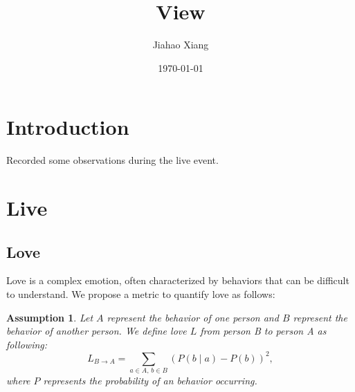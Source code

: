 \documentclass{article}
\title{View}
\author{Jiahao Xiang}
\date{\today}
\newtheorem{assumption}{Assumption}
\begin{document}
\maketitle

\section{Introduction}
Recorded some observations during the live event.

\section{Live}
\subsection{Love}
Love is a complex emotion, often characterized by behaviors that can be difficult to understand. We propose a metric to quantify love as follows:

\begin{assumption}
    Let $A$ represent the behavior of one person and $B$ represent the behavior of another person. We define love $L$ from person B to person A as following:
    \begin{equation}
        L_{B\to A}=\sum_{a\in A,\, b\in B}(P(b\mid a)-P(b))^2,
    \end{equation}
    where $P$ represents the probability of an behavior occurring.
\end{assumption}
\end{document}
